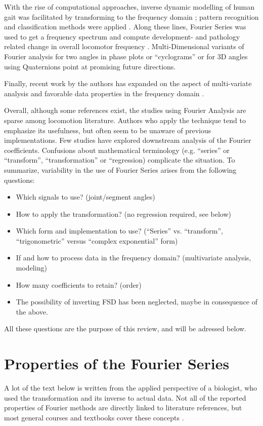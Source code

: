 \documentclass[10pt,a4paper]{article}
\begin{document}
With the rise of computational approaches, inverse dynamic modelling of human gait was facilitated by transforming to the frequency domain \citep{Ren2007}; pattern recognition and classification methods were applied \citep[e.g.][]{Mostayed2008}.
Along these lines, Fourier Series was used to get a frequency spectrum and compute development- and pathology related change in overall locomotor frequency \citep[e.g.][]{Kurz2011}.
Multi-Dimensional variants of Fourier analysis for two angles in phase plots or ``cyclograms'' \citep{DiBerardinoIII2010} or for 3D angles using Quaternions \citep{Kenwright2015} point at promising future directions.


Finally, recent work by the authors has expanded on the aspect of multi-variate analysis and favorable data properties in the frequency domain \citep{Mielke2019,Mielke2022}.


Overall, although some references exist, the studies using Fourier Analysis are sparse among locomotion literature.
Authors who apply the technique tend to emphasize its usefulness, but often seem to be unaware of previous implementations.
Few studies have explored downstream analysis of the Fourier coefficients.
Confusions about mathematical terminology (e.g. ``series'' or ``transform'', ``transformation'' or ``regression) complicate the situation.
To summarize, variability in the use of Fourier Series arises from the following questions:
\begin{itemize}
\item Which signals to use? (joint/segment angles)
\item How to apply the transformation? (no regression required, see below)
\item Which form and implementation to use? (``Series'' vs. ``transform'', ``trigonometric'' versus ``complex exponential'' form)
\item If and how to process data in the frequency domain? (multivariate analysis, modeling)
\item How many coefficients to retain? (order)
\item The possibility of inverting FSD has been neglected, maybe in consequence of the above.
\end{itemize}

All these questions are the purpose of this review, and will be adressed below.

\FloatBarrier\clearpage
\section{Properties of the Fourier Series}
\label{properties}
A lot of the text below is written from the applied perspective of a biologist, who used the transformation and its inverse to actual data.
Not all of the reported properties of Fourier methods are directly linked to literature references, but most general courses and textbooks cover these concepts \citep[e.g.][]{Bracewell2000,Osgood2007,Osgood2019}.
\end{document}
